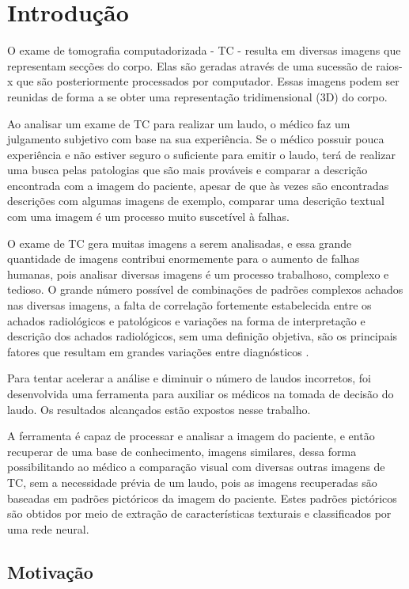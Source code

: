 \chapter{Introdução}

O exame de tomografia computadorizada - TC - resulta em diversas imagens que representam secções do corpo. Elas são geradas através de uma sucessão de raios-x que são posteriormente processados por computador. Essas imagens podem ser reunidas de forma a se obter uma representação tridimensional (3D) do corpo.

Ao analisar um exame de TC para realizar um laudo, o médico faz um julgamento subjetivo com base na sua experiência. Se o médico possuir pouca experiência e não estiver seguro o suficiente para emitir o laudo, terá de realizar uma busca pelas patologias que são mais prováveis e comparar a descrição encontrada com a imagem do paciente, apesar de que às vezes são encontradas descrições com algumas imagens de exemplo, comparar uma descrição textual com uma imagem é um processo muito suscetível à falhas.

O exame de TC gera muitas imagens a serem analisadas, e essa grande quantidade de imagens contribui enormemente para o aumento de falhas humanas, pois analisar diversas imagens é um processo trabalhoso, complexo e tedioso. O grande número possível de combinações de padrões complexos achados nas diversas imagens, a falta de correlação fortemente estabelecida entre os achados radiológicos e patológicos e variações na forma de interpretação e descrição dos achados radiológicos, sem uma definição objetiva, são os principais fatores que resultam em grandes variações entre diagnósticos \cite{uchiyama}.

Para tentar acelerar a análise e diminuir o número de laudos incorretos, foi desenvolvida uma ferramenta para auxiliar os médicos na tomada de decisão do laudo. Os resultados alcançados estão expostos nesse trabalho.

A ferramenta é capaz de processar e analisar a imagem do paciente, e então recuperar de uma base de conhecimento, imagens similares, dessa forma possibilitando ao médico a comparação visual com diversas outras imagens de TC, sem a necessidade prévia de um laudo, pois as imagens recuperadas são baseadas em padrões pictóricos da imagem do paciente. Estes padrões pictóricos são obtidos por meio de extração de características texturais e classificados por uma rede neural.

\section{Motivação}

